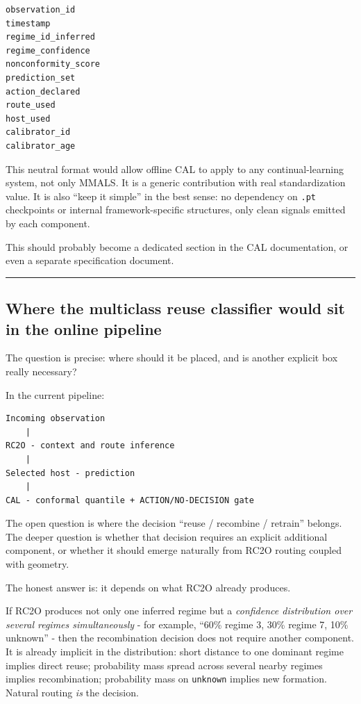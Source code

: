 \begin{lstlisting}
observation_id
timestamp
regime_id_inferred
regime_confidence
nonconformity_score
prediction_set
action_declared
route_used
host_used
calibrator_id
calibrator_age
\end{lstlisting}

This neutral format would allow offline CAL to apply to any continual-learning system, not only MMALS. It is a generic contribution with real standardization value. It is also ``keep it simple'' in the best sense: no dependency on \passthrough{\lstinline!.pt!} checkpoints or internal framework-specific structures, only clean signals emitted by each component.

This should probably become a dedicated section in the CAL documentation, or even a separate specification document.

\begin{center}\rule{0.5\linewidth}{0.5pt}\end{center}

\subsection{Where the multiclass reuse classifier would sit in the online pipeline}\label{where-the-multiclass-reuse-classifier-would-sit-in-the-online-pipeline}

The question is precise: where should it be placed, and is another explicit box really necessary?

In the current pipeline:

\begin{lstlisting}
Incoming observation
    |
RC2O - context and route inference
    |
Selected host - prediction
    |
CAL - conformal quantile + ACTION/NO-DECISION gate
\end{lstlisting}

The open question is where the decision ``reuse / recombine / retrain'' belongs. The deeper question is whether that decision requires an explicit additional component, or whether it should emerge naturally from RC2O routing coupled with geometry.

The honest answer is: it depends on what RC2O already produces.

If RC2O produces not only one inferred regime but a \emph{confidence distribution over several regimes simultaneously} - for example, ``60\% regime 3, 30\% regime 7, 10\% unknown'' - then the recombination decision does not require another component. It is already implicit in the distribution: short distance to one dominant regime implies direct reuse; probability mass spread across several nearby regimes implies recombination; probability mass on \passthrough{\lstinline!unknown!} implies new formation. Natural routing \emph{is} the decision.

